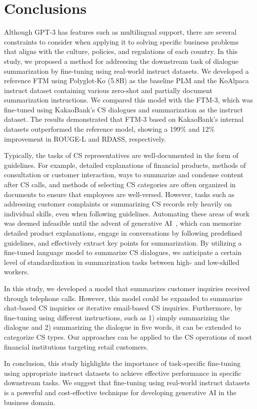 \documentclass[sigconf]{acmart}
\begin{document}
\section{Conclusions}\label{conclusions}
Although GPT-3 has features such as multilingual support, there are several constraints to consider when applying it to solving specific business problems that aligns with the culture, policies, and regulations of each country. In this study, we proposed a method for addressing the downstream task of dialogue summarization by fine-tuning using real-world instruct datasets. We developed a reference FTM using Polyglot-Ko (5.8B) as the baseline PLM and the KoAlpaca instruct dataset containing various zero-shot and partially document summarization instructions. We compared this model with the FTM-3, which was fine-tuned using KakaoBank's CS dialogues and summarization as the instruct dataset. The results demonstrated that FTM-3 based on KakaoBank's internal datasets outperformed the reference model, showing a 199\% and 12\% improvement in ROUGE-L and RDASS, respectively.


Typically, the tasks of CS representatives are well-documented in the form of guidelines. For example, detailed explanations of financial products, methods of consultation or customer interaction, ways to summarize and condense content after CS calls, and methods of selecting CS categories are often organized in documents to ensure that employees are well-versed. However, tasks such as addressing customer complaints or summarizing CS records rely heavily on individual skills, even when following guidelines. Automating these areas of work was deemed infeasible until the advent of generative AI~\cite{polanyi:1966}, which can memorize detailed product explanations, engage in conversations by following predefined guidelines, and effectively extract key points for summarization. By utilizing a fine-tuned language model to summarize CS dialogues, we anticipate a certain level of standardization in summarization tasks between high- and low-skilled workers. 


In this study, we developed a model that summarizes customer inquiries received through telephone calls. However, this model could be expanded to summarize chat-based CS inquiries or iterative email-based CS inquiries. Furthermore, by fine-tuning using different instructions, such as 1) simply summarizing the dialogue and 2) summarizing the dialogue in five words, it can be extended to categorize CS types. Our approaches can be applied to the CS operations of most financial institutions targeting retail customers.


In conclusion, this study highlights the importance of task-specific fine-tuning using appropriate instruct datasets to achieve effective performance in specific downstream tasks. We suggest that fine-tuning using real-world instruct datasets is a powerful and cost-effective technique for developing generative AI in the business domain.




 
\end{document}
